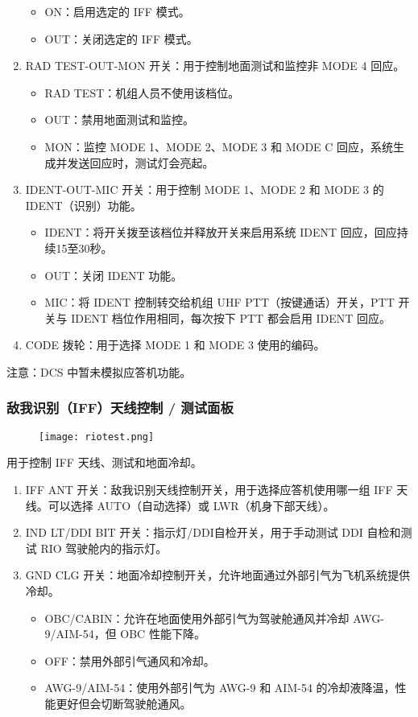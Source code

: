 \begin{enumerate}
\begin{itemize}
		      \item ON：启用选定的 IFF 模式。
		      \item OUT：关闭选定的 IFF 模式。
	      \end{itemize}
	\item RAD TEST-OUT-MON 开关：用于控制地面测试和监控非 MODE 4 回应。
	      \begin{itemize}
		      \item RAD TEST：机组人员不使用该档位。
		      \item OUT：禁用地面测试和监控。
		      \item MON：监控 MODE 1、MODE 2、MODE 3 和 MODE C 回应，系统生成并发送回应时，测试灯会亮起。
	      \end{itemize}
	\item IDENT-OUT-MIC 开关：用于控制 MODE 1、MODE 2 和 MODE 3 的 IDENT（识别）功能。
	      \begin{itemize}
		      \item IDENT：将开关拨至该档位并释放开关来启用系统 IDENT 回应，回应持续15至30秒。
		      \item OUT：关闭 IDENT 功能。
		      \item MIC：将 IDENT 控制转交给机组 UHF PTT（按键通话）开关，PTT 开关与 IDENT 档位作用相同，每次按下 PTT 都会启用 IDENT 回应。
	      \end{itemize}
	\item CODE 拨轮：用于选择 MODE 1 和 MODE 3 使用的编码。
\end{enumerate}
注意：DCS 中暂未模拟应答机功能。

\subsubsection{敌我识别（IFF）天线控制 / 测试面板}
\begin{figure}[htb]
	\centering
	\texttt{[image: riotest.png]}
\end{figure}
用于控制 IFF 天线、测试和地面冷却。

\begin{enumerate}
	\item IFF ANT 开关：敌我识别天线控制开关，用于选择应答机使用哪一组 IFF 天线。可以选择 AUTO（自动选择）或 LWR（机身下部天线）。
	\item IND LT/DDI BIT 开关：指示灯/DDI自检开关，用于手动测试 DDI 自检和测试 RIO 驾驶舱内的指示灯。
	\item GND CLG 开关：地面冷却控制开关，允许地面通过外部引气为飞机系统提供冷却。
	      \begin{itemize}
		      \item OBC/CABIN：允许在地面使用外部引气为驾驶舱通风并冷却 AWG-9/AIM-54，但 OBC 性能下降。
		      \item OFF：禁用外部引气通风和冷却。
		      \item AWG-9/AIM-54：使用外部引气为 AWG-9 和 AIM-54 的冷却液降温，性能更好但会切断驾驶舱通风。
	      \end{itemize}
\end{enumerate}


